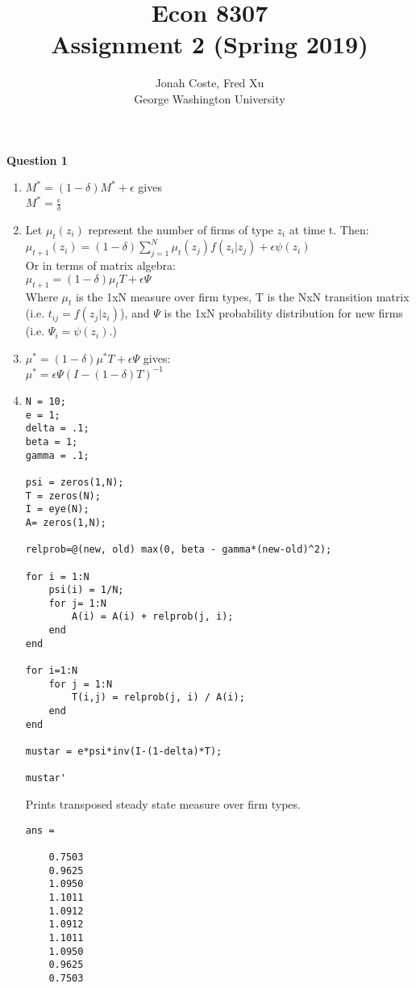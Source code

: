 \documentclass[12pt]{article}
\begin{document}
\begin{onehalfspace}


\title{Econ 8307\\ Assignment 2 (Spring 2019)}
\author{Jonah Coste, Fred Xu\\George Washington University}
\date{}
\maketitle
\parskip 10pt
\textbf{Question 1}
\begin{enumerate}[1.]
	\item
	$M^* = (1-\delta)M^* + \epsilon$ gives\\ $M^*= \frac{\epsilon}{\delta}$
	\item
	Let $\mu_t(z_i)$ represent the number of firms of type $z_i$ at time t. Then:\\
	$\mu_{t+1}(z_i) = (1-\delta)\sum_{j=1}^N{\mu_t(z_j)f(z_i|z_j)} + \epsilon\psi(z_i)$\\
	Or in terms of matrix algebra:\\
	$\mu_{t+1} = (1-\delta)\mu_tT + \epsilon\Psi$\\
	Where $\mu_t$ is the 1xN measure over firm types, T is the NxN transition matrix (i.e. $t_{ij} = f(z_j|z_i)$), and $\Psi$ is the 1xN probability distribution for new firms (i.e. $\Psi_i = \psi(z_i)$.)
	\item
	$\mu^* = (1-\delta)\mu^*T + \epsilon\Psi$ gives:\\
	$\mu^* = \epsilon\Psi(I-(1-\delta)T)^{-1}$
	
	\item
	\begin{lstlisting}
N = 10;
e = 1;
delta = .1;
beta = 1;
gamma = .1;

psi = zeros(1,N);
T = zeros(N);
I = eye(N);
A= zeros(1,N);

relprob=@(new, old) max(0, beta - gamma*(new-old)^2);

for i = 1:N
    psi(i) = 1/N;
    for j= 1:N
        A(i) = A(i) + relprob(j, i);
    end
end

for i=1:N
    for j = 1:N
        T(i,j) = relprob(j, i) / A(i);
    end
end

mustar = e*psi*inv(I-(1-delta)*T);

mustar'
	\end{lstlisting}
	Prints transposed steady state measure over firm types.
	\begin{lstlisting}
ans =

    0.7503
    0.9625
    1.0950
    1.1011
    1.0912
    1.0912
    1.1011
    1.0950
    0.9625
    0.7503
	\end{lstlisting}
	\end{enumerate}


\end{onehalfspace}
\end{document}
